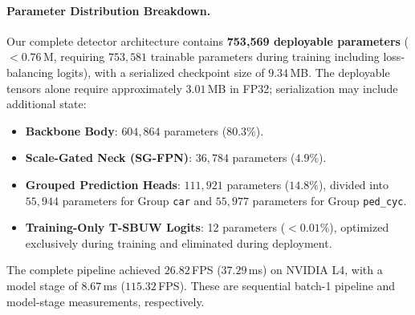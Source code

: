 \paragraph{Parameter Distribution Breakdown.}
Our complete detector architecture contains \textbf{753,569 deployable parameters} ($< 0.76$\,M, requiring $753{,}581$ trainable parameters during training including loss-balancing logits), with a serialized checkpoint size of $9.34$\,MB. The deployable tensors alone require approximately $3.01$\,MB in FP32; serialization may include additional state:
\begin{itemize}
    \item \textbf{Backbone Body}: $604,864$ parameters ($80.3\%$).
    \item \textbf{Scale-Gated Neck (SG-FPN)}: $36,784$ parameters ($4.9\%$).
    \item \textbf{Grouped Prediction Heads}: $111,921$ parameters ($14.8\%$), divided into $55,944$ parameters for Group \texttt{car} and $55,977$ parameters for Group \texttt{ped\_cyc}.
    \item \textbf{Training-Only T-SBUW Logits}: 12 parameters ($< 0.01\%$), optimized exclusively during training and eliminated during deployment.
\end{itemize}
The complete pipeline achieved $26.82$\,FPS ($37.29$\,ms) on NVIDIA L4, with a model stage of $8.67$\,ms ($115.32$\,FPS). These are sequential batch-1 pipeline and model-stage measurements, respectively.
